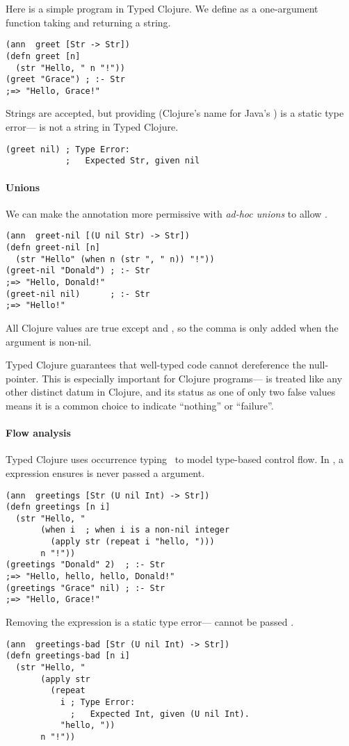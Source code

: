 Here is a simple program in Typed Clojure.
%
We define  as a one-argument function
taking and returning a string.

\begin{verbatim}
(ann  greet [Str -> Str])
(defn greet [n]
  (str "Hello, " n "!"))
(greet "Grace") ; :- Str
;=> "Hello, Grace!"
\end{verbatim}
%
Strings are accepted, but providing  (Clojure's name for Java's )
is a static type error--- is not a string in Typed Clojure.
%
\begin{verbatim}
(greet nil) ; Type Error:
            ;   Expected Str, given nil
\end{verbatim}

\paragraph{Unions} We can make the annotation more permissive with \emph{ad-hoc unions}
to allow .

\begin{verbatim}
(ann  greet-nil [(U nil Str) -> Str])
(defn greet-nil [n]
  (str "Hello" (when n (str ", " n)) "!"))
(greet-nil "Donald") ; :- Str
;=> "Hello, Donald!"
(greet-nil nil)      ; :- Str
;=> "Hello!"
\end{verbatim}

All Clojure values are true except  and , so the
comma is only added when the argument is non-nil.

Typed Clojure guarantees that well-typed code cannot
dereference the null-pointer.
This is especially important for Clojure programs---
is treated like any other distinct datum in Clojure,  and its status as
one of only two false values means it is a common choice to indicate
``nothing'' or ``failure''.

\paragraph{Flow analysis} Typed Clojure uses occurrence typing~\cite{TF10} to
model type-based control flow.
In , a  expression ensures 
is never passed a  argument.
%
\begin{verbatim}
(ann  greetings [Str (U nil Int) -> Str])
(defn greetings [n i]
  (str "Hello, "
       (when i  ; when i is a non-nil integer
         (apply str (repeat i "hello, ")))
       n "!"))
(greetings "Donald" 2)  ; :- Str
;=> "Hello, hello, hello, Donald!"
(greetings "Grace" nil) ; :- Str
;=> "Hello, Grace!"
\end{verbatim}
%
Removing the  expression is a static type error--- 
cannot be passed .
%
\begin{verbatim}
(ann  greetings-bad [Str (U nil Int) -> Str])
(defn greetings-bad [n i]
  (str "Hello, "
       (apply str 
         (repeat 
           i ; Type Error:
             ;   Expected Int, given (U nil Int).
           "hello, "))
       n "!"))
\end{verbatim}



